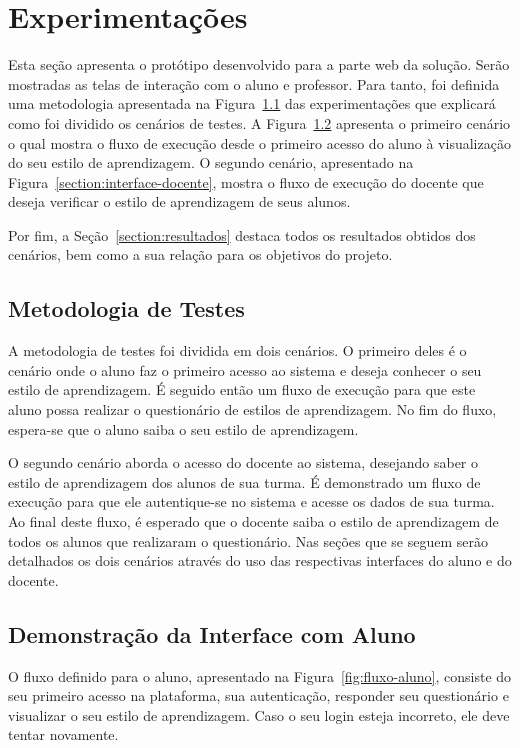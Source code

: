 \chapter{Experimentações}

Esta seção apresenta o protótipo desenvolvido para a parte web da solução. Serão mostradas as telas de interação com o aluno e professor. Para tanto, foi definida uma metodologia apresentada na Figura~\ref{section:metodologia-testes} das experimentações que explicará como foi dividido os cenários de testes.
A Figura~\ref{section:interface-aluno} apresenta o primeiro cenário o qual mostra o fluxo de execução desde o primeiro acesso do aluno à visualização do seu estilo de aprendizagem. O segundo cenário, apresentado na Figura~\ref{section:interface-docente}, mostra o fluxo de execução do docente que deseja verificar o estilo de aprendizagem de seus alunos.

Por fim, a Seção~\ref{section:resultados} destaca todos os resultados obtidos dos cenários, bem como a sua relação para os objetivos do projeto.

\section{Metodologia de Testes}\label{section:metodologia-testes}

A metodologia de testes foi dividida em dois cenários. O primeiro deles é o cenário onde o aluno faz o primeiro acesso ao sistema e deseja conhecer o seu estilo de aprendizagem. É seguido então um fluxo de execução para que este aluno possa realizar o questionário de estilos de aprendizagem. No fim do fluxo, espera-se que o aluno saiba o seu estilo de aprendizagem.

O segundo cenário aborda o acesso do docente ao sistema, desejando saber o estilo de aprendizagem dos alunos de sua turma. É demonstrado um fluxo de execução para que ele autentique-se no sistema e acesse os dados de sua turma. Ao final deste fluxo, é esperado que o docente saiba o estilo de aprendizagem de todos os alunos que realizaram o questionário. Nas seções que se seguem serão detalhados os dois cenários através do uso das respectivas interfaces do aluno e do docente.

\section{Demonstração da Interface com Aluno}\label{section:interface-aluno}
O fluxo definido para o aluno, apresentado na Figura~\ref{fig:fluxo-aluno}, consiste do seu primeiro acesso na plataforma, sua autenticação, responder seu questionário e visualizar o seu estilo de aprendizagem. Caso o seu login esteja incorreto, ele deve tentar novamente.

